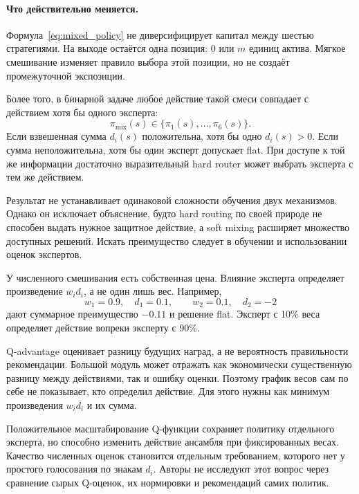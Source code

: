 \documentclass[9pt,a4paper,twocolumn]{extarticle}
\begin{document}
\paragraph{Что действительно меняется.}

Формула~\eqref{eq:mixed_policy} не диверсифицирует капитал между шестью стратегиями. На выходе
остаётся одна позиция: $0$ или $m$ единиц актива. Мягкое смешивание изменяет правило выбора этой
позиции, но не создаёт промежуточной экспозиции.

Более того, в бинарной задаче любое действие такой смеси совпадает с действием хотя бы одного
эксперта:
\begin{equation}
  \pi_{\mathrm{mix}}(s)
  \in
  \{\pi_1(s),\ldots,\pi_6(s)\}.
  \label{eq:binary_action_support}
\end{equation}
Если взвешенная сумма $d_i(s)$ положительна, хотя бы одно $d_i(s)>0$. Если сумма неположительна,
хотя бы один эксперт допускает flat. При доступе к той же информации достаточно выразительный
hard router может выбрать эксперта с тем же действием.

Результат не устанавливает одинаковой сложности обучения двух механизмов. Однако он исключает
объяснение, будто hard routing по своей природе не способен выдать нужное защитное действие, а
soft mixing расширяет множество доступных решений. Искать преимущество следует в обучении и
использовании оценок экспертов.

У численного смешивания есть собственная цена. Влияние эксперта определяет произведение $w_i
d_i$, а не один лишь вес. Например,
\[
  w_1=0.9,\quad d_1=0.1,
  \qquad
  w_2=0.1,\quad d_2=-2
\]
дают суммарное преимущество $-0.11$ и решение flat. Эксперт с 10\% веса определяет действие
вопреки эксперту с 90\%.

Q-advantage оценивает разницу будущих наград, а не вероятность правильности рекомендации.
Большой модуль может отражать как экономически существенную разницу между действиями, так и
ошибку оценки. Поэтому график весов сам по себе не показывает, кто определил действие. Для этого
нужны как минимум произведения $w_i d_i$ и их сумма.

Положительное масштабирование Q-функции сохраняет политику отдельного эксперта, но способно
изменить действие ансамбля при фиксированных весах. Качество численных оценок становится
отдельным требованием, которого нет у простого голосования по знакам $d_i$. Авторы не исследуют
этот вопрос через сравнение сырых Q-оценок, их нормировки и рекомендаций самих политик.
\end{document}
